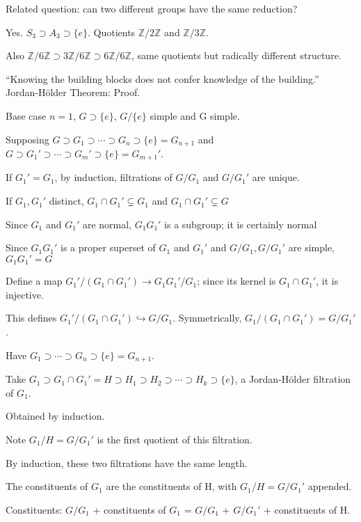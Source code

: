 \documentclass[12pt]{article}
\begin{document}
\noindent
Related question: can two different groups have the same reduction?

Yes.  $S_3 \supset A_3 \supset \{e\}.$ Quotients $\mathds{Z}/2\mathds{Z}$ and $\mathds{Z}/3\mathds{Z}$.

Also $\mathds{Z}/6\mathds{Z} \supset 3\mathds{Z}/6\mathds{Z} \supset 6\mathds{Z}/6\mathds{Z}$, same quotients but radically different structure.

``Knowing the building blocks does not confer knowledge of the building.''\\

\noindent
Jordan-H\"{o}lder Theorem: Proof.

Base case $n = 1$, $G \supset \{e\}$, $G/\{e\}$ simple and G simple.

Supposing $G \supset G_1 \supset \cdots \supset G_n \supset \{e\} = G_{n + 1}$ and $G \supset G_1' \supset \cdots \supset G_m' \supset \{e\} = G_{m + 1}'$.

If $G_1' = G_1$, by induction, filtrations of $G/G_1$ and $G/G_1'$ are unique.

If $G_1, G_1'$ distinct, $G_1 \cap G_1' \subsetneq G_1$ and $G_1 \cap G_1' \subsetneq G$

Since $G_1$ and $G_1'$ are normal, $G_1G_1'$ is a subgroup; it is certainly normal

Since $G_1G_1'$ is a proper superset of $G_1$ and $G_1'$ and $G/G_1, G/G_1'$ are simple, $G_1G_1' = G$

Define a map $G_1'/(G_1 \cap G_1') \to G_1G_1'/G_1$; since its kernel is $G_1 \cap G_1'$, it is injective.

This defines $G_1'/(G_1 \cap G_1') \hookrightarrow G/G_1$.  Symmetrically, $G_1/(G_1 \cap G_1') = G/G_1'$.

Have $G_1 \supset \cdots \supset G_n \supset \{e\} = G_{n + 1}$.

Take $G_1 \supset G_1 \cap G_1' = H \supset H_1 \supset H_2 \supset \cdots \supset H_k \supset \{e\}$, a Jordan-H\"{o}lder filtration of $G_1$.

Obtained by induction.

Note $G_1/H = G/G_1'$ is the first quotient of this filtration.

By induction, these two filtrations have the same length.

The constituents of $G_1$ are the constituents of H, with $G_1/H = G/G_1'$ appended.

Constituents: $G/G_1$ + constituents of $G_1$ = $G/G_1$ + $G/G_1'$ + constituents of H.
\end{document}
